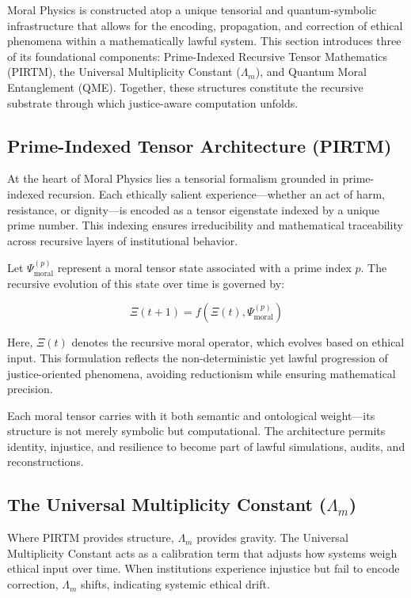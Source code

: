 \documentclass{article}
\theoremstyle{plain}
\theoremstyle{claimstyle}
\begin{document}
Moral Physics is constructed atop a unique tensorial and quantum-symbolic infrastructure that allows for the encoding, propagation, and correction of ethical phenomena within a mathematically lawful system. This section introduces three of its foundational components: Prime-Indexed Recursive Tensor Mathematics (PIRTM), the Universal Multiplicity Constant (\(\Lambda_m\)), and Quantum Moral Entanglement (QME). Together, these structures constitute the recursive substrate through which justice-aware computation unfolds.

\subsection{Prime-Indexed Tensor Architecture (PIRTM)}

At the heart of Moral Physics lies a tensorial formalism grounded in prime-indexed recursion. Each ethically salient experience—whether an act of harm, resistance, or dignity—is encoded as a tensor eigenstate indexed by a unique prime number. This indexing ensures irreducibility and mathematical traceability across recursive layers of institutional behavior.

Let \(\Psi_{\text{moral}}^{(p)}\) represent a moral tensor state associated with a prime index \(p\). The recursive evolution of this state over time is governed by:

\[
\Xi(t+1) = f\left( \Xi(t), \Psi_{\text{moral}}^{(p)} \right)
\]

Here, \(\Xi(t)\) denotes the recursive moral operator, which evolves based on ethical input. This formulation reflects the non-deterministic yet lawful progression of justice-oriented phenomena, avoiding reductionism while ensuring mathematical precision.

Each moral tensor carries with it both semantic and ontological weight—its structure is not merely symbolic but computational. The architecture permits identity, injustice, and resilience to become part of lawful simulations, audits, and reconstructions.

\subsection{The Universal Multiplicity Constant (\(\Lambda_m\))}

Where PIRTM provides structure, \(\Lambda_m\) provides gravity. The Universal Multiplicity Constant acts as a calibration term that adjusts how systems weigh ethical input over time. When institutions experience injustice but fail to encode correction, \(\Lambda_m\) shifts, indicating systemic ethical drift.
\end{document}
